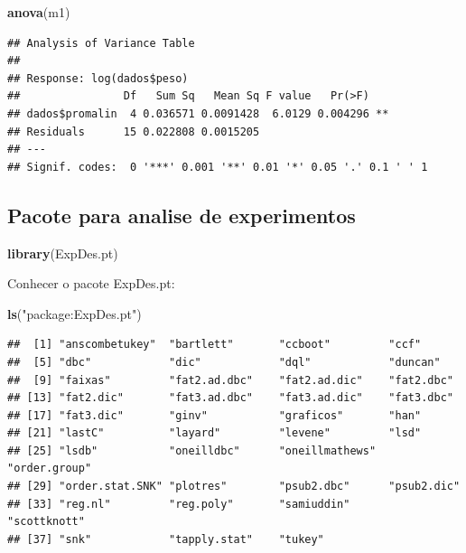 \documentclass[
]{book}
\newenvironment{Shaded}{\begin{snugshade}}{\end{snugshade}}
\newcommand{\KeywordTok}[1]{\textcolor[rgb]{0.13,0.29,0.53}{\textbf{#1}}}
\newcommand{\NormalTok}[1]{#1}
\newcommand{\StringTok}[1]{\textcolor[rgb]{0.31,0.60,0.02}{#1}}
\begin{document}
\begin{Shaded}
\begin{Highlighting}[]
\KeywordTok{anova}\NormalTok{(m1)}
\end{Highlighting}
\end{Shaded}

\begin{verbatim}
## Analysis of Variance Table
## 
## Response: log(dados$peso)
##                Df   Sum Sq   Mean Sq F value   Pr(>F)   
## dados$promalin  4 0.036571 0.0091428  6.0129 0.004296 **
## Residuals      15 0.022808 0.0015205                    
## ---
## Signif. codes:  0 '***' 0.001 '**' 0.01 '*' 0.05 '.' 0.1 ' ' 1
\end{verbatim}

\hypertarget{pacote-para-analise-de-experimentos}{%
\subsection{Pacote para analise de experimentos}\label{pacote-para-analise-de-experimentos}}

\begin{Shaded}
\begin{Highlighting}[]
\KeywordTok{library}\NormalTok{(ExpDes.pt)}
\end{Highlighting}
\end{Shaded}

Conhecer o pacote ExpDes.pt:

\begin{Shaded}
\begin{Highlighting}[]
\KeywordTok{ls}\NormalTok{(}\StringTok{"package:ExpDes.pt"}\NormalTok{)}
\end{Highlighting}
\end{Shaded}

\begin{verbatim}
##  [1] "anscombetukey"  "bartlett"       "ccboot"         "ccf"           
##  [5] "dbc"            "dic"            "dql"            "duncan"        
##  [9] "faixas"         "fat2.ad.dbc"    "fat2.ad.dic"    "fat2.dbc"      
## [13] "fat2.dic"       "fat3.ad.dbc"    "fat3.ad.dic"    "fat3.dbc"      
## [17] "fat3.dic"       "ginv"           "graficos"       "han"           
## [21] "lastC"          "layard"         "levene"         "lsd"           
## [25] "lsdb"           "oneilldbc"      "oneillmathews"  "order.group"   
## [29] "order.stat.SNK" "plotres"        "psub2.dbc"      "psub2.dic"     
## [33] "reg.nl"         "reg.poly"       "samiuddin"      "scottknott"    
## [37] "snk"            "tapply.stat"    "tukey"
\end{verbatim}
\end{document}

